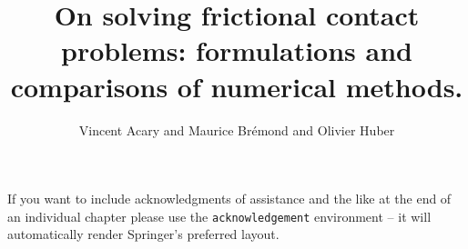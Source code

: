 \documentclass[graybox]{svmult}
\begin{document}
\title*{On solving frictional contact problems: formulations and comparisons of numerical methods.}
\author{Vincent Acary and Maurice Br\'emond and Olivier Huber}
%
%
\maketitle

\abstract*{}

\abstract{}





\begin{acknowledgement}
If you want to include acknowledgments of assistance and the like at the end of an individual chapter please use the \verb|acknowledgement| environment -- it will automatically render Springer's preferred layout.
\end{acknowledgement}
%





%


%
\end{document}
